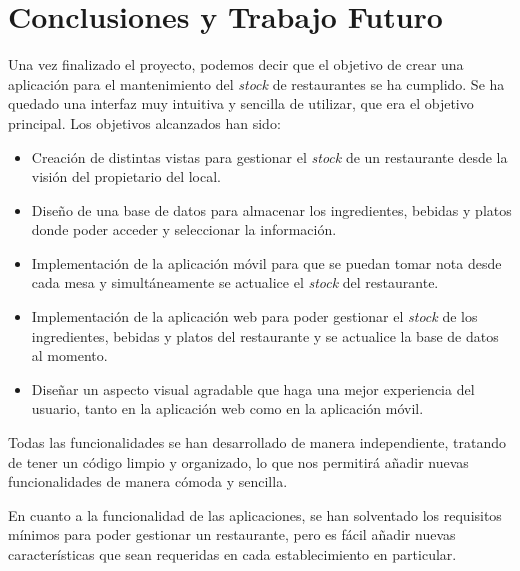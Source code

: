 \chapter{Conclusiones y Trabajo Futuro}
\label{cap:conclusiones}

Una vez finalizado el proyecto, podemos decir que el objetivo de crear una aplicación para el mantenimiento del \textit{stock} de restaurantes se ha cumplido. Se ha quedado una interfaz muy intuitiva y sencilla de utilizar, que era el objetivo principal. Los objetivos alcanzados han sido:

\begin{itemize} 

\item Creación de distintas vistas para gestionar el \textit{stock} de un restaurante desde la visión del propietario del local.

\item Diseño de una base de datos para almacenar los ingredientes, bebidas y platos donde poder acceder y seleccionar la información.

\item Implementación de la aplicación móvil para que se puedan tomar nota desde cada mesa y simultáneamente se actualice el \textit{stock} del restaurante.

\item Implementación de la aplicación web para poder gestionar el \textit{stock} de los ingredientes, bebidas y platos del restaurante y se actualice la base de datos al momento.
 
\item Diseñar un aspecto visual agradable que haga una mejor experiencia del usuario, tanto en la aplicación web como en la aplicación móvil.

 \end{itemize}

Todas las funcionalidades se han desarrollado de manera independiente, tratando de tener un código limpio y organizado, lo que nos permitirá añadir nuevas funcionalidades de manera cómoda y sencilla.

En cuanto a la funcionalidad de las aplicaciones, se han solventado los requisitos mínimos para poder gestionar un restaurante, pero es fácil añadir nuevas características que sean requeridas en cada establecimiento en particular.

